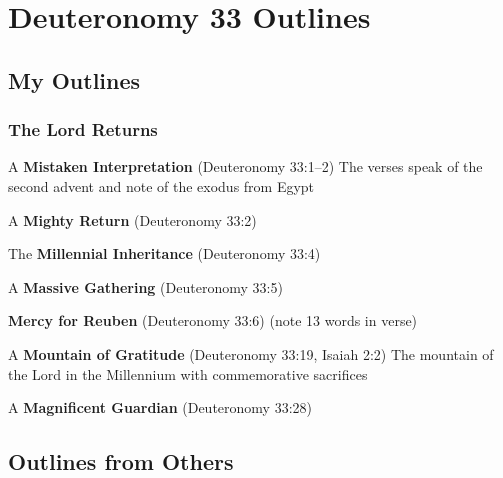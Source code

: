 \section{Deuteronomy 33 Outlines}


\subsection{My Outlines}

\subsubsection{The Lord Returns}
\begin{compactenum}[I.][7]
    \item A \textbf{Mistaken Interpretation} (Deuteronomy 33:1--2) The verses speak of the second advent and note of the exodus from Egypt
    \item A \textbf{Mighty Return} (Deuteronomy 33:2)
    \item The \textbf{Millennial Inheritance} (Deuteronomy 33:4)
    \item A \textbf{Massive Gathering} (Deuteronomy 33:5)
    \item \textbf{Mercy for Reuben} (Deuteronomy 33:6) (note 13 words in verse)
    \item A \textbf{Mountain of Gratitude} (Deuteronomy 33:19, Isaiah 2:2) The mountain of the Lord in the Millennium with commemorative sacrifices
    \item A \textbf{Magnificent Guardian} (Deuteronomy 33:28) 
\end{compactenum}



\subsection{Outlines from Others}